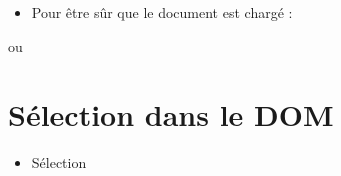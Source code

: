\begin{itemize}
\tightlist
\item
  Pour être sûr que le document est chargé :
\end{itemize}

\begin{otherlanguage}{english}

\begin{Shaded}
\begin{Highlighting}[]
\AttributeTok{$}\NormalTok{(}\NormalTok{()}\OperatorTok{\{}
    \NormalTok{(}\NormalTok{)}
\OperatorTok{\}}\NormalTok{)}\OperatorTok{;}
\end{Highlighting}
\end{Shaded}

\end{otherlanguage}

ou

\begin{otherlanguage}{english}

\begin{Shaded}
\begin{Highlighting}[]
\AttributeTok{$}\NormalTok{(}\NormalTok{() }\OperatorTok{\{}
    \NormalTok{(}\NormalTok{)}
\OperatorTok{\}}\NormalTok{)}\OperatorTok{;}
\end{Highlighting}
\end{Shaded}

\end{otherlanguage}

\begin{otherlanguage}{english}

\end{otherlanguage}

\hypertarget{suxe9lection-dans-le-dom}{%
\section{Sélection dans le DOM}\label{suxe9lection-dans-le-dom}}

\begin{itemize}
\tightlist
\item
  Sélection
\end{itemize}

\begin{otherlanguage}{english}

\begin{Shaded}
\begin{Highlighting}[]
\AttributeTok{$}\NormalTok{(}\NormalTok{)}\OperatorTok{;}                        
\AttributeTok{$}\NormalTok{(}\NormalTok{()}\OperatorTok{;}                 
\end{Highlighting}
\end{Shaded}

\end{otherlanguage}

